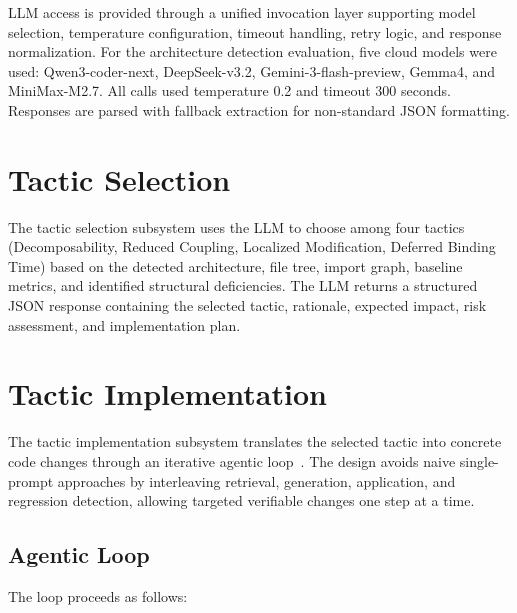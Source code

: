 LLM access is provided through a unified invocation layer supporting model selection, temperature configuration, timeout handling, retry logic, and response normalization. For the architecture detection evaluation, five cloud models were used: Qwen3-coder-next, DeepSeek-v3.2, Gemini-3-flash-preview, Gemma4, and MiniMax-M2.7. All calls used temperature 0.2 and timeout 300 seconds. Responses are parsed with fallback extraction for non-standard JSON formatting.

\section{Tactic Selection}

The tactic selection subsystem uses the LLM to choose among four tactics (Decomposability, Reduced Coupling, Localized Modification, Deferred Binding Time) based on the detected architecture, file tree, import graph, baseline metrics, and identified structural deficiencies. The LLM returns a structured JSON response containing the selected tactic, rationale, expected impact, risk assessment, and implementation plan.

\section{Tactic Implementation}
\label{sec:impl_tactic_implementation}

The tactic implementation subsystem translates the selected tactic into concrete code changes through an iterative agentic loop~\cite{yao2022react}. The design avoids naive single-prompt approaches by interleaving retrieval, generation, application, and regression detection, allowing targeted verifiable changes one step at a time.

\subsection{Agentic Loop}

The loop proceeds as follows:

